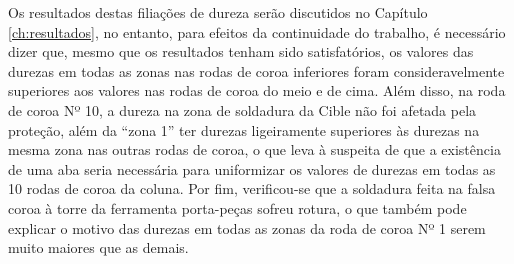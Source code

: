 \par
Os resultados destas filiações de dureza serão discutidos no Capítulo \ref{ch:resultados}, no entanto, para efeitos da continuidade do trabalho, é necessário dizer que, mesmo que os resultados tenham sido satisfatórios, os valores das durezas em todas as zonas nas rodas de coroa inferiores foram consideravelmente superiores aos valores nas rodas de coroa do meio e de cima. Além disso, na roda de coroa Nº 10, a dureza na zona de soldadura da Cible não foi afetada pela proteção, além da “zona 1” ter durezas ligeiramente superiores às durezas na mesma zona nas outras rodas de coroa, o que leva à suspeita de que a existência de uma aba seria necessária para uniformizar os valores de durezas em todas as 10 rodas de coroa da coluna. Por fim, verificou-se que a soldadura feita na falsa coroa à torre da ferramenta porta-peças sofreu rotura, o que também pode explicar o motivo das durezas em todas as zonas da roda de coroa Nº 1 serem muito maiores que as demais.
